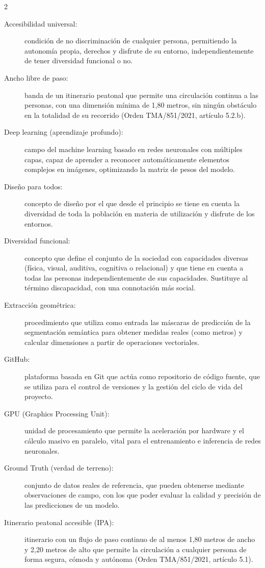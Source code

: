 \begin{multicols}{2}
\begin{description}
    \item[Accesibilidad universal:] condición de no discriminación de cualquier persona, permitiendo la autonomía propia, derechos y disfrute de su entorno, independientemente de tener diversidad funcional o no.
    \item[Ancho libre de paso:] banda de un itinerario peatonal que permite una circulación continua a las personas, con una dimensión mínima de 1,80 metros, sin ningún obstáculo en la totalidad de su recorrido (Orden TMA/851/2021, artículo 5.2.b).
    \item[Deep learning (aprendizaje profundo):] campo del machine learning basado en redes neuronales con múltiples capas, capaz de aprender a reconocer automáticamente elementos complejos en imágenes, optimizando la matriz de pesos del modelo.
    \item[Diseño para todos:] concepto de diseño por el que desde el principio se tiene en cuenta la diversidad de toda la población en materia de utilización y disfrute de los entornos.
    \item[Diversidad funcional:] concepto que define el conjunto de la sociedad con capacidades diversas (física, visual, auditiva, cognitiva o relacional) y que tiene en cuenta a todas las personas independientemente de sus capacidades. Sustituye al término discapacidad, con una connotación más social.
    \item[Extracción geométrica:] procedimiento que utiliza como entrada las máscaras de predicción de la segmentación semántica para obtener medidas reales (como metros) y calcular dimensiones a partir de operaciones vectoriales.
    \item[GitHub:] plataforma basada en Git que actúa como repositorio de código fuente, que se utiliza para el control de versiones y la gestión del ciclo de vida del proyecto.
    \item[GPU (Graphics Processing Unit):] unidad de procesamiento que permite la aceleración por hardware y el cálculo masivo en paralelo, vital para el entrenamiento e inferencia de redes neuronales.
    \item[Ground Truth (verdad de terreno):] conjunto de datos reales de referencia, que pueden obtenerse mediante observaciones de campo, con los que poder evaluar la calidad y precisión de las predicciones de un modelo.
    \item[Itinerario peatonal accesible (IPA):] itinerario con un flujo de paso continuo de al menos 1,80 metros de ancho y 2,20 metros de alto que permite la circulación a cualquier persona de forma segura, cómoda y autónoma (Orden TMA/851/2021, artículo 5.1).

\end{description}
\end{multicols}
